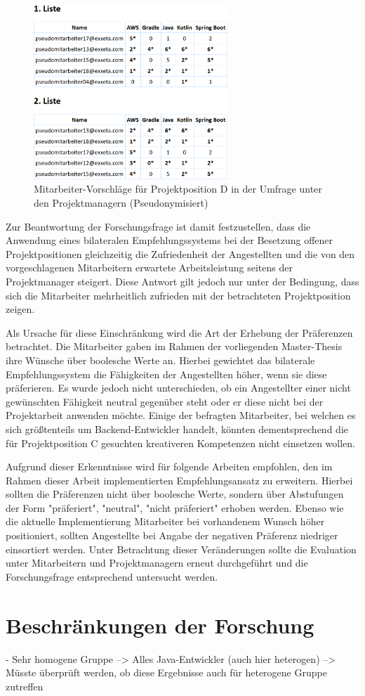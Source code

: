 \begin{figure}[h]
	\centering
	\includegraphics[width=0.65\textwidth]{gfx/projektposition-d.png}
	\caption{Mitarbeiter-Vorschläge für Projektposition D in der Umfrage unter den Projektmanagern (Pseudonymisiert)}
	\label{fig:diskussion:interpretation:abb2}
\end{figure}

Zur Beantwortung der Forschungsfrage ist damit festzustellen, dass die Anwendung eines bilateralen Empfehlungssystems bei der Besetzung offener Projektpositionen gleichzeitig die Zufriedenheit der Angestellten und die von den vorgeschlagenen Mitarbeitern erwartete Arbeitsleistung seitens der Projektmanager steigert. Diese Antwort gilt jedoch nur unter der Bedingung, dass sich die Mitarbeiter mehrheitlich zufrieden mit der betrachteten Projektposition zeigen.

Als Ursache für diese Einschränkung wird die Art der Erhebung der Präferenzen betrachtet. Die Mitarbeiter gaben im Rahmen der vorliegenden Master-Thesis ihre Wünsche über boolesche Werte an. Hierbei gewichtet das bilaterale Empfehlungssystem die Fähigkeiten der Angestellten höher, wenn sie diese präferieren. Es wurde jedoch nicht unterschieden, ob ein Angestellter einer nicht gewünschten Fähigkeit neutral gegenüber steht oder er diese nicht bei der Projektarbeit anwenden möchte. Einige der befragten Mitarbeiter, bei welchen es sich größtenteils um Backend-Entwickler handelt, könnten dementsprechend die für Projektposition C gesuchten kreativeren Kompetenzen nicht einsetzen wollen.

Aufgrund dieser Erkenntnisse wird für folgende Arbeiten empfohlen, den im Rahmen dieser Arbeit implementierten Empfehlungsansatz zu erweitern. Hierbei sollten die Präferenzen nicht über boolesche Werte, sondern über Abstufungen der Form "präferiert", "neutral", "nicht präferiert" erhoben werden. Ebenso wie die aktuelle Implementierung Mitarbeiter bei vorhandenem Wunsch höher positioniert, sollten Angestellte bei Angabe der negativen Präferenz niedriger einsortiert werden. Unter Betrachtung dieser Veränderungen sollte die Evaluation unter Mitarbeitern und Projektmanagern erneut durchgeführt und die Forschungsfrage entsprechend untersucht werden.

\section{Beschränkungen der Forschung}
\label{ch:diskussion:beschraenkungen}
- Sehr homogene Gruppe --> Alles Java-Entwickler (auch hier heterogen) --> Müsste überprüft werden, ob diese Ergebnisse auch für heterogene Gruppe zutreffen

